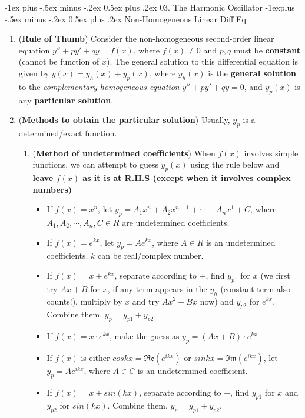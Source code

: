 \documentclass[10pt, landscape]{article}
\makeatletter
\renewcommand{\section}{\@startsection{section}{1}{0mm}%
                                {-1ex plus -.5ex minus -.2ex}%
                                {0.5ex plus .2ex}%
                                {\normalfont\large\bfseries}}
\renewcommand{\subsection}{\@startsection{subsection}{2}{0mm}%
                                {-1explus -.5ex minus -.2ex}%
                                {0.5ex plus .2ex}%
                                {\normalfont\normalsize\bfseries}}
\makeatother
\begin{document}
\begin{multicols}{4}
\section{03. The Harmonic Oscillator}
\subsection{Non-Homogeneous Linear Diff Eq}
\begin{enumerate}
    \item (\textbf{Rule of Thumb}) Consider the non-homogeneous second-order linear equation $y''+py'+qy=f(x)$, where $f(x)\neq 0$ and $p, q$ must be \textbf{constant} (cannot be function of $x$). The general solution to this differential equation is given by $y(x)=y_h(x)+y_p(x)$, where $y_h(x)$ is the \textbf{general solution} to the \textit{complementary homogeneous equation} $y''+py'+qy=0$, and $y_p(x)$ is any \textbf{particular solution}.
    \item (\textbf{Methods to obtain the particular solution})
    Usually, $y_p$ is a determined/exact function.
    \begin{enumerate}
        \item (\textbf{Method of undetermined coefficients}) When $f(x)$ involves simple functions, we can attempt to guess $y_p(x)$ using the rule below and \textbf{leave $f(x)$ as it is at R.H.S (except when it involves complex numbers)}
        \begin{itemize}
            \item If $f(x)=x^n$, let $y_p=A_1x^n+A_2x^{n-1}+\cdots+A_nx^1+C$, where $A_1, A_2,\cdots, A_n, C \in R$ are undetermined coefficients.
            \item If $f(x)=e^{kx}$, let $y_p=Ae^{kx}$, where $A\in R$ is an undetermined coefficients. $k$ can be real/complex number.
            \item If $f(x)=x\pm e^{kx}$, separate according to $\pm$, find $y_{p1}$ for $x$ (we first try $Ax+B$ for $x$, if any term appears in the $y_h$ (constant term also counts!), multiply by $x$ and try $Ax^2+Bx$ now) and $y_{p2}$ for $e^{kx}$. Combine them, $y_p=y_{p1}+y_{p2}$.
            \item If $f(x)=x\cdot e^{kx}$, make the guess as $y_p=(Ax+B)\cdot e^{kx}$
            \item If $f(x)$ is either $coskx=\Re\mathfrak{e}(e^{ikx})$ or $sinkx=\Im\mathfrak{m}(e^{ikx})$, let $y_p=Ae^{ikx}$, where $A\in C$ is an undetermined coefficient.
            \item If $f(x)=x\pm sin(kx)$, separate according to $\pm$, find $y_{p1}$ for $x$ and $y_{p2}$ for $sin(kx)$. Combine them, $y_p=y_{p1}+y_{p2}$.

\end{itemize}
\end{enumerate}
\end{enumerate}
\end{multicols}
\end{document}
